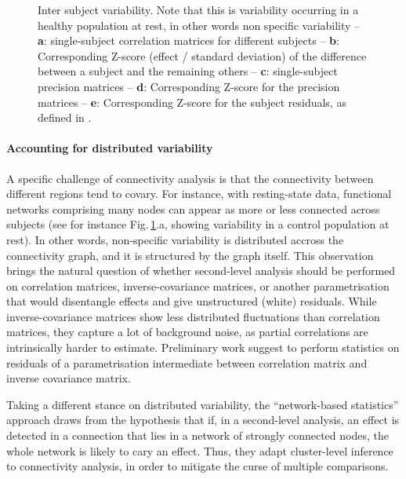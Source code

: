\documentclass[5p]{elsarticle}
\begin{document}
\begin{figure}
\caption{Inter subject variability. Note that this is variability
occurring in a healthy population at rest, in other words non specific
variability -- \textbf{a}: single-subject
correlation matrices for different subjects -- \textbf{b}:
Corresponding Z-score (effect / standard deviation) of the difference
between a subject and the remaining others -- \textbf{c}:
single-subject precision matrices -- \textbf{d}: Corresponding Z-score
for the precision matrices -- \textbf{e}:
Corresponding Z-score for the subject residuals, as defined in 
\cite{varoquaux2010b}.
\label{fig:inter_subject}}
\end{figure}

\paragraph{Accounting for distributed variability}
%
A specific challenge of connectivity analysis is that the connectivity
between different regions tend to covary. For instance, with
resting-state data, functional networks comprising many nodes can appear
as more or less connected across subjects (see for instance
Fig.\,\ref{fig:inter_subject}.a, showing variability in a control
population at rest). In other words, non-specific variability is
distributed accross the connectivity graph, and it is structured by the
graph itself. This observation brings the natural question of whether
second-level analysis should be performed on correlation matrices,
inverse-covariance matrices, or another parametrisation that would
disentangle effects and give unstructured (white) residuals. While
inverse-covariance matrices show less distributed fluctuations than
correlation matrices, they capture a lot of background noise, as partial
correlations are intrinsically harder to estimate. Preliminary work
\cite{varoquaux2010b} suggest to perform statistics on residuals of
a parametrisation intermediate between correlation matrix and inverse
covariance matrix.

Taking a different stance on distributed variability, the ``network-based
statistics'' approach \cite{zalesky2010} draws from the hypothesis that
if, in a second-level analysis, an effect is detected in a connection
that lies in a network of strongly connected nodes, the whole network is
likely to cary an effect. Thus, they adapt cluster-level inference to
connectivity analysis, in order to mitigate the curse of multiple
comparisons.
\end{document}
